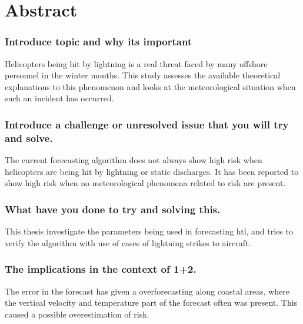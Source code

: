 \chapter*{Abstract}

\subsection*{Introduce topic and why its important}
Helicopters being hit by lightning is a real threat faced by many offshore personnel in the winter months. This study assesses the available theoretical explanations to this phenomenon and looks at the meteorological situation when such an incident has occurred.

\subsection*{Introduce a challenge or unresolved issue that you will try and solve.} 
The current forecasting algorithm does not always show high risk when helicopters are being hit by lightning or static discharges. It has been reported to show high risk when no meteorological phenomena related to risk are present.

\subsection*{What have you done to try and solving this.}
This thesis investigate the parameters being used in forecasting \acrfull{htl}, and tries to verify the algorithm with use of cases of lightning strikes to aircraft. 


\subsection*{The implications in the context of 1+2.}
The error in the forecast has given a overforecasting along coastal areas, where the vertical velocity and temperature part of the forecast often was present. This caused a possible overestimation of risk.